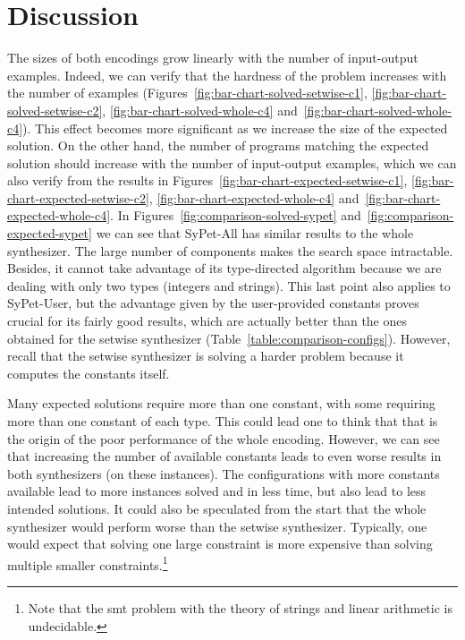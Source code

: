\section{Discussion}
\label{sec:discussion}

The sizes of both encodings grow linearly with the number of input-output
examples. Indeed, we can verify that the hardness of the problem increases with
the number of examples (Figures~\ref{fig:bar-chart-solved-setwise-c1},
\ref{fig:bar-chart-solved-setwise-c2}, \ref{fig:bar-chart-solved-whole-c4}
and~\ref{fig:bar-chart-solved-whole-c4}).
This effect becomes more significant as we increase the size of the expected
solution.
On the other hand, the number of programs matching the expected solution should
increase with the number of input-output examples, which we can also verify from
the results in Figures~\ref{fig:bar-chart-expected-setwise-c1},
\ref{fig:bar-chart-expected-setwise-c2}, \ref{fig:bar-chart-expected-whole-c4}
and~\ref{fig:bar-chart-expected-whole-c4}.
In Figures~\ref{fig:comparison-solved-sypet}
and~\ref{fig:comparison-expected-sypet} we can see that SyPet-All has similar
results to the whole synthesizer.
The large number of components makes the search space intractable.
Besides, it cannot take advantage of its type-directed algorithm because we are
dealing with only two types (integers and strings).
This last point also applies to SyPet-User, but the advantage given by the
user-provided constants proves crucial for its fairly good results, which are
actually better than the ones obtained for the setwise synthesizer
(Table~\ref{table:comparison-configs}).
However, recall that the setwise synthesizer is solving a harder problem because
it computes the constants itself.

Many expected solutions require more than one constant, with some requiring more
than one constant of each type.
This could lead one to think that that is the origin of the poor performance of
the whole encoding.
However, we can see that increasing the number of available constants leads to
even worse results in both synthesizers (on these instances).
The configurations with more constants available lead to more instances solved
and in less time, but also lead to less intended solutions.
It could also be speculated from the start that the whole synthesizer would
perform worse than the setwise synthesizer.
Typically, one would expect that solving one large constraint is more expensive
than solving multiple smaller constraints.\footnote{Note that the \gls{smt}
problem with the theory of strings and linear arithmetic is undecidable.}

